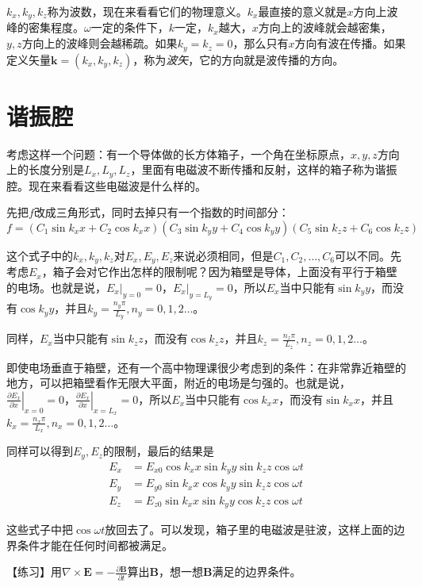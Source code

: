 $k_x,k_y,k_z$称为波数，现在来看看它们的物理意义。$k_x$最直接的意义就是$x$方向上波峰的密集程度。$\omega$一定的条件下，$k$一定，$k_x$越大，$x$方向上的波峰就会越密集，$y,z$方向上的波峰则会越稀疏。如果$k_y=k_z=0$，那么只有$x$方向有波在传播。如果定义矢量$\mathbf{k}=(k_x,k_y,k_z)$，称为\emph{波矢}，它的方向就是波传播的方向。
\section{谐振腔}
考虑这样一个问题：有一个导体做的长方体箱子，一个角在坐标原点，$x,y,z$方向上的长度分别是$L_x,L_y,L_z$，里面有电磁波不断传播和反射，这样的箱子称为谐振腔。现在来看看这些电磁波是什么样的。

先把$f$改成三角形式，同时去掉只有一个指数的时间部分：
\begin{equation*}
f=(C_1 \sin k_x x+C_2 \cos k_x x)(C_3 \sin k_y y+C_4 \cos k_y y)(C_5 \sin k_z z+C_6 \cos k_z z)
\end{equation*}

这个式子中的$k_x,k_y,k_z$对$E_x,E_y,E_z$来说必须相同，但是$C_1,C_2,\dots,C_6$可以不同。先考虑$E_x$，箱子会对它作出怎样的限制呢？因为箱壁是导体，上面没有平行于箱壁的电场。也就是说，$E_x|_{y=0}=0$，$E_x|_{y=L_y}=0$，所以$E_x$当中只能有$\sin k_y y$，而没有$\cos k_y y$，并且$k_y=\frac{n_y \pi}{L_y}, n_y=0,1,2 \dots$。

同样，$E_x$当中只能有$\sin k_z z$，而没有$\cos k_z z$，并且$k_z=\frac{n_z \pi}{L_z}, n_z=0,1,2 \dots$。

即使电场垂直于箱壁，还有一个高中物理课很少考虑到的条件：在非常靠近箱壁的地方，可以把箱壁看作无限大平面，附近的电场是匀强的。也就是说，$\left. \frac{\partial E_x}{\partial x} \right|_{x=0}=0$，$\left. \frac{\partial E_x}{\partial x} \right|_{x=L_x}=0$，所以$E_x$当中只能有$\cos k_x x$，而没有$\sin k_x x$，并且$k_x=\frac{n_x \pi}{L_x}, n_x=0,1,2 \dots$。

同样可以得到$E_y,E_z$的限制，最后的结果是
\begin{align*}
E_x&=E_{x 0} \cos k_x x \sin k_y y \sin k_z z \cos \omega t \\
E_y&=E_{y 0} \sin k_x x \cos k_y y \sin k_z z \cos \omega t \\
E_z&=E_{z 0} \sin k_x x \sin k_y y \cos k_z z \cos \omega t
\end{align*}

这些式子中把$\cos \omega t$放回去了。可以发现，箱子里的电磁波是驻波，这样上面的边界条件才能在任何时间都被满足。

【练习】用$\nabla \times \mathbf{E}=-\frac{\partial \mathbf{B}}{\partial t}$算出$\mathbf{B}$，想一想$\mathbf{B}$满足的边界条件。

